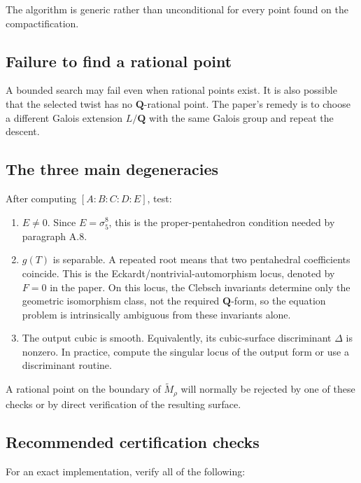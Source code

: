 \documentclass[11pt]{article}
\newcommand{\QQ}{\mathbf{Q}}
\newcommand{\tM}{\widetilde{M}}
\begin{document}
The algorithm is generic rather than unconditional for every point found on
the compactification.

\subsection{Failure to find a rational point}

A bounded search may fail even when rational points exist.  It is also
possible that the selected twist has no $\QQ$-rational point.  The paper's
remedy is to choose a different Galois extension $L/\QQ$ with the same Galois
group and repeat the descent.

\subsection{The three main degeneracies}

After computing $[A:B:C:D:E]$, test:

\begin{enumerate}
\item $E\neq0$.  Since $E=\sigma_5^8$, this is the proper-pentahedron
condition needed by paragraph A.8.

\item $g(T)$ is separable.  A repeated root means that two pentahedral
coefficients coincide.  This is the Eckardt/nontrivial-automorphism locus,
denoted by $F=0$ in the paper.  On this locus, the Clebsch invariants determine
only the geometric isomorphism class, not the required $\QQ$-form, so the
equation problem is intrinsically ambiguous from these invariants alone.

\item The output cubic is smooth.  Equivalently, its cubic-surface
discriminant $\Delta$ is nonzero.  In practice, compute the singular locus of
the output form or use a discriminant routine.
\end{enumerate}

A rational point on the boundary of $\tM_{\rho}$ will normally be rejected by
one of these checks or by direct verification of the resulting surface.

\subsection{Recommended certification checks}

For an exact implementation, verify all of the following:
\end{document}
